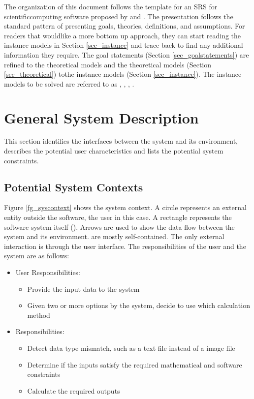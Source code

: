 \documentclass[12pt]{article}
\begin{document}
The organization of this document follows the template for an SRS for
scientificcomputing software proposed by \cite{Parnas1972} and
\cite{ParnasAndClements1986}. The presentation follows the standard pattern of
presenting goals, theories, definitions, and assumptions. For readers that
wouldlike a more bottom up approach, they can start reading the instance
models in Section \ref{sec_instance} and trace back to find any additional
information they require.
The goal statements (Section \ref{sec_goalstatements}) are refined to the
theoretical models and the theoretical models (Section \ref{sec_theoretical})
tothe instance models (Section \ref{sec_instance}). The instance models to be
solved are referred to as , ,
, .

\section{General System Description}

This section identifies the interfaces between the system and its environment,
describes the potential user characteristics and lists the potential system
constraints.

\subsection{Potential System Contexts}

Figure \ref{fg_syscontext} shows the system context. A circle represents an
external entity outside the software, the user in this case. A rectangle
represents the software system itself (\famname).
Arrows are used to show the data flow between the system and its environment.
\progname{} are mostly self-contained. The only external interaction is through
the user interface. The responsibilities of the user and the system are as
follows:

\begin{itemize}
\item User Responsibilities:
\begin{itemize}
\item Provide the input data to the system
\item Given two or more options by the system, decide to use which calculation
method
\end{itemize}
\item \progname{} Responsibilities:
\begin{itemize}
\item Detect data type mismatch, such as a text file instead of a image file
\item Determine if the inputs satisfy the required mathematical and software
constraints
\item Calculate the required outputs
\end{itemize}
\end{itemize}
\end{document}
